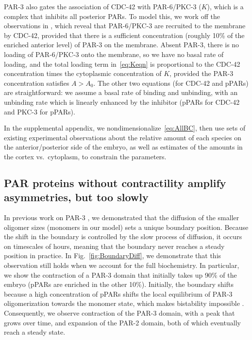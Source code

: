 \documentclass[11pt]{article}
\newcommand{\6}[1]{#1_{\text{6}}}
\newcommand{\3}[1]{#1_{\text{3}}}
\begin{document}
PAR-3 also gates the association of CDC-42 with PAR-6/PKC-3 ($K$), which is a complex that inhibits all posterior PARs. To model this, we work off the observations in \cite{sailer2015dynamic}, which reveal that PAR-6/PKC-3 are recruited to the membrane by CDC-42, provided that there is a sufficient concentration (roughly 10\% of the enriched anterior level) of PAR-3 on the membrane. Absent PAR-3, there is no loading of PAR-6/PKC-3 onto the membrane, so we have no basal rate of loading, and the total loading term in\ \eqref{eq:Keqn} is proportional to the CDC-42 concentration times the cytoplasmic concentration of $K$, provided the PAR-3 concentration satisfies $A > A_0$. The other two equations (for CDC-42 and pPARs) are straightforward: we assume a basal rate of binding and unbinding, with an unbinding rate which is linearly enhanced by the inhibitor (pPARs for CDC-42 and PKC-3 for pPARs). 

In the supplemental appendix, we nondimensionalize\ \eqref{eq:AllBC}, then use sets of existing experimental observations about the relative amount of each species on the anterior/posterior side of the embryo, as well as estimates of the amounts in the cortex vs.\ cytoplasm, to constrain the parameters. 

\subsection{PAR proteins without contractility amplify asymmetries, but too slowly}
In previous work on PAR-3 \cite{lang2023oligomerization}, we demonstrated that the diffusion of the smaller oligomer sizes (monomers in our model) sets a unique boundary position. Because the shift in the boundary is controlled by the slow process of diffusion, it occurs on timescales of hours, meaning that the boundary never reaches a steady position in practice. In Fig.\ \ref{fig:BoundaryDiff}, we demonstrate that this observation still holds when we account for the full biochemistry. In particular, we show the contraction of a PAR-3 domain that initially takes up 90\% of the embryo (pPARs are enriched in the other 10\%). Initially, the boundary shifts because a high concentration of pPARs shifts the local equilibrium of PAR-3 oligomerization towards the monomer state, which makes bistability impossible \cite{lang2023oligomerization}. Consequently, we observe contraction of the PAR-3 domain, with a peak that grows over time, and expansion of the PAR-2 domain, both of which eventually reach a steady state. 
\end{document}

